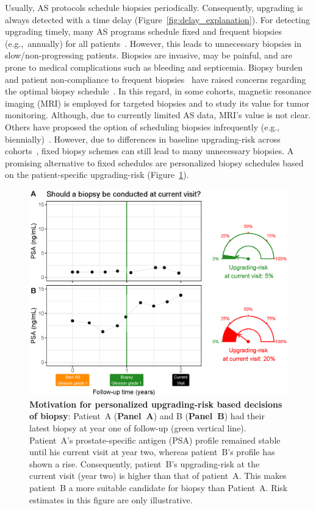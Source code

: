 Usually, AS protocols schedule biopsies periodically. Consequently, upgrading is always detected with a time delay (Figure~\ref{fig:delay_explanation}). For detecting upgrading timely, many AS programs schedule fixed and frequent biopsies (e.g.,~annually) for all patients~\citep{nieboer2018active,loeb2014heterogeneity}. However, this leads to unnecessary biopsies in slow/non-progressing patients. Biopsies are invasive, may be painful, and are prone to medical complications such as bleeding and septicemia\citep{loeb2013systematic}. Biopsy burden and patient non-compliance to frequent biopsies~\citep{bokhorst2015compliance} have raised concerns regarding the optimal biopsy schedule~\citep{inoue2018comparative, bratt2013study}. In this regard, in some cohorts, magnetic resonance imaging (MRI) is employed for targeted biopsies and to study its value for tumor monitoring. Although, due to currently limited AS data, MRI's value is not clear. Others have proposed the option of scheduling biopsies infrequently (e.g., biennially)~\citep{inoue2018comparative,de2017estimating}. However, due to differences in baseline upgrading-risk across cohorts~\citep{inoue2018comparative}, fixed biopsy schemes can still lead to many unnecessary biopsies. A promising alternative to fixed schedules are personalized biopsy schedules based on the patient-specific upgrading-risk (Figure~\ref{fig:riskBasedExample}).

\begin{figure}
\centerline{\includegraphics[width=\columnwidth]{images/riskBasedExample.eps}}
\caption{\textbf{Motivation for personalized upgrading-risk based decisions of biopsy}: Patient~A (\textbf{Panel~A}) and B (\textbf{Panel~B}) had their latest biopsy at year one of follow-up (green vertical line). Patient~A's prostate-specific antigen (PSA) profile remained stable until his current visit at year two, whereas patient~B's profile has shown a rise. Consequently, patient~B's upgrading-risk at the current visit (year two) is higher than that of patient~A. This makes patient~B a more suitable candidate for biopsy than Patient~A. Risk estimates in this figure are only illustrative.}
\label{fig:riskBasedExample}
\end{figure}

